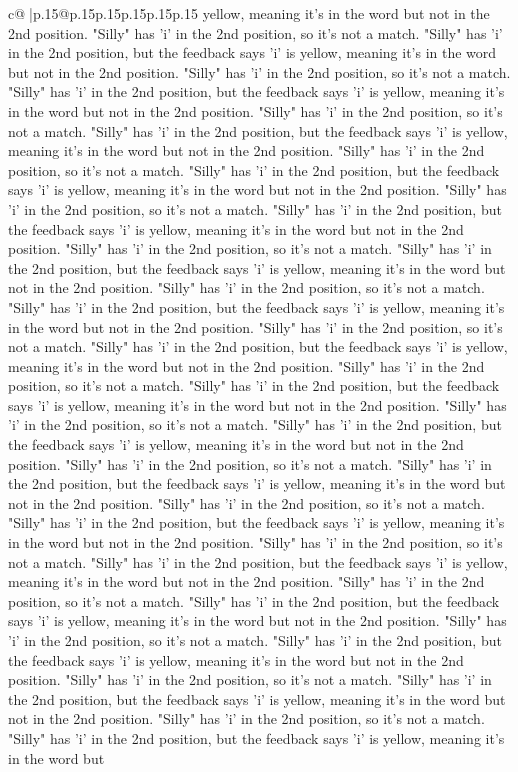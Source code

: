 \documentclass{article}
\begin{document}
{\begin{supertabular}{c@{$\;$}|p{.15\linewidth}@{}p{.15\linewidth}p{.15\linewidth}p{.15\linewidth}p{.15\linewidth}p{.15\linewidth}}
{{{yellow, meaning it's in the word but not in the 2nd position. "Silly" has 'i' in the 2nd position, so it's not a match. "Silly" has 'i' in the 2nd position, but the feedback says 'i' is yellow, meaning it's in the word but not in the 2nd position. "Silly" has 'i' in the 2nd position, so it's not a match. "Silly" has 'i' in the 2nd position, but the feedback says 'i' is yellow, meaning it's in the word but not in the 2nd position. "Silly" has 'i' in the 2nd position, so it's not a match. "Silly" has 'i' in the 2nd position, but the feedback says 'i' is yellow, meaning it's in the word but not in the 2nd position. "Silly" has 'i' in the 2nd position, so it's not a match. "Silly" has 'i' in the 2nd position, but the feedback says 'i' is yellow, meaning it's in the word but not in the 2nd position. "Silly" has 'i' in the 2nd position, so it's not a match. "Silly" has 'i' in the 2nd position, but the feedback says 'i' is yellow, meaning it's in the word but not in the 2nd position. "Silly" has 'i' in the 2nd position, so it's not a match. "Silly" has 'i' in the 2nd position, but the feedback says 'i' is yellow, meaning it's in the word but not in the 2nd position. "Silly" has 'i' in the 2nd position, so it's not a match. "Silly" has 'i' in the 2nd position, but the feedback says 'i' is yellow, meaning it's in the word but not in the 2nd position. "Silly" has 'i' in the 2nd position, so it's not a match. "Silly" has 'i' in the 2nd position, but the feedback says 'i' is yellow, meaning it's in the word but not in the 2nd position. "Silly" has 'i' in the 2nd position, so it's not a match. "Silly" has 'i' in the 2nd position, but the feedback says 'i' is yellow, meaning it's in the word but not in the 2nd position. "Silly" has 'i' in the 2nd position, so it's not a match. "Silly" has 'i' in the 2nd position, but the feedback says 'i' is yellow, meaning it's in the word but not in the 2nd position. "Silly" has 'i' in the 2nd position, so it's not a match. "Silly" has 'i' in the 2nd position, but the feedback says 'i' is yellow, meaning it's in the word but not in the 2nd position. "Silly" has 'i' in the 2nd position, so it's not a match. "Silly" has 'i' in the 2nd position, but the feedback says 'i' is yellow, meaning it's in the word but not in the 2nd position. "Silly" has 'i' in the 2nd position, so it's not a match. "Silly" has 'i' in the 2nd position, but the feedback says 'i' is yellow, meaning it's in the word but not in the 2nd position. "Silly" has 'i' in the 2nd position, so it's not a match. "Silly" has 'i' in the 2nd position, but the feedback says 'i' is yellow, meaning it's in the word but not in the 2nd position. "Silly" has 'i' in the 2nd position, so it's not a match. "Silly" has 'i' in the 2nd position, but the feedback says 'i' is yellow, meaning it's in the word but not in the 2nd position. "Silly" has 'i' in the 2nd position, so it's not a match. "Silly" has 'i' in the 2nd position, but the feedback says 'i' is yellow, meaning it's in the word but not in the 2nd position. "Silly" has 'i' in the 2nd position, so it's not a match. "Silly" has 'i' in the 2nd position, but the feedback says 'i' is yellow, meaning it's in the word but }}}
\end{supertabular}}
\end{document}
